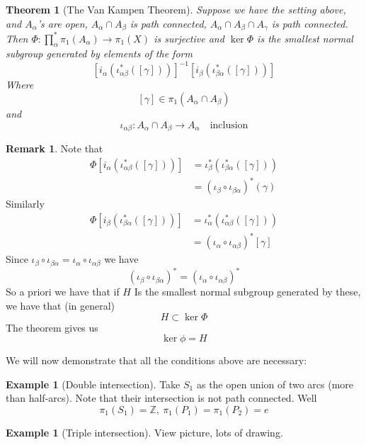 \documentclass[11pt,a4paper]{article}
\theoremstyle{definition}
\newtheorem{example}[definition]{Example}
\newtheorem{remark}[definition]{Remark}
\theoremstyle{plain}
\newtheorem{theorem}[definition]{Theorem}
\theoremstyle{remark}
\newcommand{\Z}{\mathbb{Z}}
\newcommand{\1}{\mathbbm{1}}
\begin{document}
\begin{theorem}[The Van Kampen Theorem]
    Suppose we have the setting above, and $A_\alpha$'s are open, $A_\alpha \cap A_\beta$ is path connected, $A_\alpha \cap A_\beta \cap A_\gamma$ is path connected. 
    Then $\Phi \colon \prod_{\alpha}^* \pi_1(A_\alpha) \to \pi_1(X)$ is surjective and
    $\ker \Phi$ is the smallest normal subgroup generated by elements of the form 
    $$\left[i_\alpha \left(\iota_{\alpha \beta}^* ([\gamma])  \right)\right]^{-1} \left[i_\beta \left(\iota_{\beta \alpha}^* ([\gamma])\right)\right]$$
    Where 
    $$[\gamma] \in \pi_1(A_\alpha \cap A_\beta)$$
    and 
    $$\iota_{\alpha \beta} \colon A_\alpha \cap A_\beta \to A_\alpha \quad \text{inclusion}$$
\end{theorem}

\begin{remark}
    Note that 
    \begin{align*}
        \Phi \left[i_\alpha \left(\iota_{\alpha \beta}^* ([\gamma])  \right)\right] &= \iota^*_\beta \left(\iota_{\beta \alpha}^* ([\gamma])\right) \\
        &= (\iota_\beta \circ \iota_{\beta \alpha})^* (\gamma)
    \end{align*}
    Similarly 
    \begin{align*}
        \Phi \left[i_\beta \left(\iota_{\beta \alpha}^* ([\gamma])\right)\right] &= \iota_\alpha^* (\iota_{\alpha\beta}^* ([\gamma])) \\
        &= (\iota_{\alpha} \circ \iota_{\alpha \beta})^* [\gamma]
    \end{align*}
    Since $\iota_\beta \circ \iota_{\beta \alpha} = \iota_\alpha \circ \iota_{\alpha \beta}$ we have 
    $$(\iota_\beta \circ \iota_{\beta \alpha})^* = (\iota_\alpha \circ \iota_{\alpha \beta})^*$$ 
    So a priori we have that if $H$ Is the smallest normal subgroup generated by these, we have that (in general)
    $$H \subset \ker \Phi$$
    The theorem gives us 
    $$\ker \phi = H$$
\end{remark}

We will now demonstrate that all the conditions above are necessary: 
\begin{example}[Double intersection]
    Take $S_1$ as the open union of two arcs (more than half-arcs). Note that their intersection is not path connected. Well 
    $$\pi_1(S_1) = \Z, \ \pi_1(P_1) = \pi_1(P_2) = e$$ 
\end{example}

\begin{example}[Triple intersection]
    View picture, lots of drawing. 
\end{example}
\end{document}
